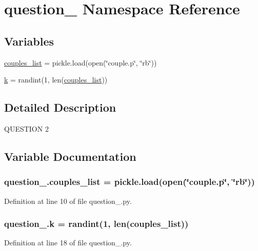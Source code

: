 \hypertarget{namespacequestion__2}{}\section{question\+\_ Namespace Reference}
\label{namespacequestion__2}
\subsection*{Variables}
\begin{DoxyCompactItemize}
\item 
\hyperlink{namespacequestion__2_a943836f0c535fc58a20da3381b87ea1b}{couples\+\_\+list} = pickle.\+load(open(\char`\"{}couple.\+p\char`\"{}, \char`\"{}rb\char`\"{}))
\item 
\hyperlink{namespacequestion__2_a9e1016bdca0ffec0f0a73013cc28152a}{k} = randint(1, len(\hyperlink{namespacequestion__2_a943836f0c535fc58a20da3381b87ea1b}{couples\+\_\+list}))
\end{DoxyCompactItemize}


\subsection{Detailed Description}
\begin{DoxyVerb}QUESTION 2\end{DoxyVerb}
 

\subsection{Variable Documentation}
\subsubsection[{\texorpdfstring{couples\+\_\+list}{couples_list}}]{\setlength{\rightskip}{0pt plus 5cm}question\+\_.\+couples\+\_\+list = pickle.\+load(open(\char`\"{}couple.\+p\char`\"{}, \char`\"{}rb\char`\"{}))}\hypertarget{namespacequestion__2_a943836f0c535fc58a20da3381b87ea1b}{}\label{namespacequestion__2_a943836f0c535fc58a20da3381b87ea1b}


Definition at line 10 of file question\+\_.\+py.

\subsubsection[{\texorpdfstring{k}{k}}]{\setlength{\rightskip}{0pt plus 5cm}question\+\_.\+k = randint(1, len({\bf couples\+\_\+list}))}\hypertarget{namespacequestion__2_a9e1016bdca0ffec0f0a73013cc28152a}{}\label{namespacequestion__2_a9e1016bdca0ffec0f0a73013cc28152a}


Definition at line 18 of file question\+\_.\+py.

